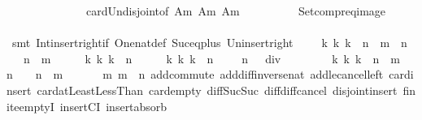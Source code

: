 \begin{isabellebody}
\ \ \ \ \ \ \ \ \ \ \ \ \ \ card{\isacharunderscore}Un{\isacharunderscore}disjoint{\isacharbrackleft}of\ {\isacharquery}Am{\isacharprime}\ {\isacharquery}Am{\isacharprime}{\isacharprime}{\isacharbrackright}\ Am\isanewline
\ \ \ \ \ \ \ \ \isamarkupfalse%
\ Setcompr{\isacharunderscore}eq{\isacharunderscore}image\isanewline
\ \ \ \ \ \ \ \ \isamarkupfalse%
\ {\isacharparenleft}smt\ Int{\isacharunderscore}insert{\isacharunderscore}right{\isacharunderscore}if{}\ One{\isacharunderscore}nat{\isacharunderscore}def\ Suc{\isacharunderscore}eq{\isacharunderscore}plus{}\ Un{\isacharunderscore}insert{\isacharunderscore}right\ {\isacartoucheopen}{\isacharparenleft}{\isacharbraceleft}{}\ {\isacharasterisk}\ {}\ {\isacharcircum}\ k\ {\isacharbar}k{\isachardot}\ k\ {\isasymin}\ {\isacharbraceleft}n\ {\isacharminus}\ m\ {\isacharplus}\ {}{\isachardot}{\isachardot}{\isacharless}n{\isacharbraceright}{\isacharbraceright}\ {\isasymunion}\ {\isacharbraceleft}{}\ {\isacharcircum}\ {\isacharparenleft}n\ {\isacharminus}\ m\ {\isacharplus}\ {}{\isacharparenright}{\isacharbraceright}{\isacharparenright}\ {\isasyminter}\ {\isacharparenleft}{\isacharbraceleft}{}\ {\isacharcircum}\ k\ {\isacharbar}k{\isachardot}\ k\ {\isasymin}\ {\isacharbraceleft}{}{\isachardot}{\isachardot}{\isacharless}n{\isacharbraceright}{\isacharbraceright}\ {\isasymunion}\ {\isacharbraceleft}{}\ {\isacharasterisk}\ {}\ {\isacharcircum}\ k\ {\isacharbar}k{\isachardot}\ k\ {\isasymin}\ {\isacharbraceleft}{}{\isachardot}{\isachardot}{\isacharless}n{\isacharbraceright}{\isacharbraceright}\ {\isasymunion}\ {\isacharbraceleft}{}{\isacharcomma}\ {\isacharparenleft}{}\ {\isacharcircum}\ n\ {\isacharplus}\ {}{\isacharparenright}\ div\ {}\ {\isacharminus}\ {}{\isacharbraceright}\ {\isacharminus}\ {\isacharparenleft}{\isacharbraceleft}{}\ {\isacharasterisk}\ {}\ {\isacharcircum}\ k\ {\isacharbar}k{\isachardot}\ k\ {\isasymin}\ {\isacharbraceleft}n\ {\isacharminus}\ m\ {\isacharplus}\ {}{\isachardot}{\isachardot}{\isacharless}n{\isacharbraceright}{\isacharbraceright}\ {\isasymunion}\ {\isacharbraceleft}{}\ {\isacharcircum}\ {\isacharparenleft}n\ {\isacharminus}\ m\ {\isacharplus}\ {}{\isacharparenright}{\isacharbraceright}{\isacharparenright}{\isacharparenright}\ {\isacharequal}\ {\isacharbraceleft}{\isacharbraceright}{\isacartoucheclose}\ {\isacartoucheopen}{}\ {\isasymle}\ m{\isacartoucheclose}\ {\isacartoucheopen}m\ {\isasymle}\ n{\isacartoucheclose}\ add{\isachardot}commute\ add{\isacharunderscore}diff{\isacharunderscore}inverse{\isacharunderscore}nat\ add{\isacharunderscore}le{\isacharunderscore}cancel{\isacharunderscore}left\ card{\isachardot}insert\ card{\isacharunderscore}atLeastLessThan\ card{\isacharunderscore}empty\ diff{\isacharunderscore}Suc{\isacharunderscore}Suc\ diff{\isacharunderscore}diff{\isacharunderscore}cancel\ disjoint{\isacharunderscore}insert{\isacharparenleft}{}{\isacharparenright}\ finite{\isachardot}emptyI\ insertCI\ insert{\isacharunderscore}absorb\ 
\end{isabellebody}
